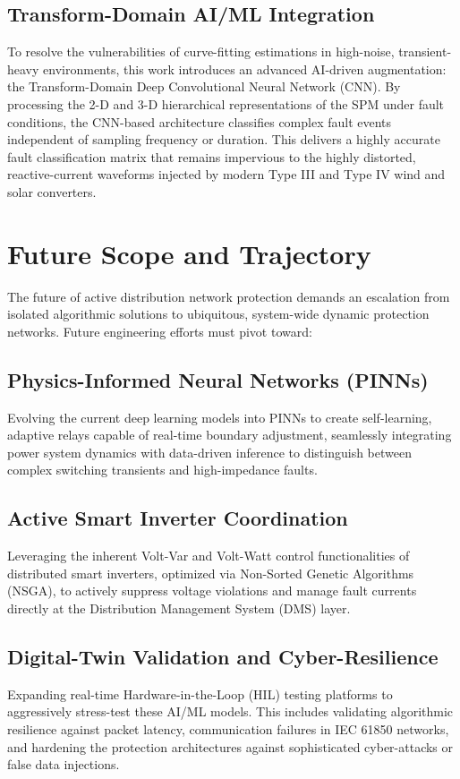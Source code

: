 \subsection{Transform-Domain AI/ML Integration}
To resolve the vulnerabilities of curve-fitting estimations in high-noise, transient-heavy environments, this work introduces an advanced AI-driven augmentation: the Transform-Domain Deep Convolutional Neural Network (CNN). By processing the 2-D and 3-D hierarchical representations of the SPM under fault conditions, the CNN-based architecture classifies complex fault events independent of sampling frequency or duration. This delivers a highly accurate fault classification matrix that remains impervious to the highly distorted, reactive-current waveforms injected by modern Type III and Type IV wind and solar converters.
\section{Future Scope and Trajectory}
The future of active distribution network protection demands an escalation from isolated algorithmic solutions to ubiquitous, system-wide dynamic protection networks. Future engineering efforts must pivot toward:
\subsection{Physics-Informed Neural Networks (PINNs)}
Evolving the current deep learning models into PINNs to create self-learning, adaptive relays capable of real-time boundary adjustment, seamlessly integrating power system dynamics with data-driven inference to distinguish between complex switching transients and high-impedance faults.
\subsection{Active Smart Inverter Coordination}
Leveraging the inherent Volt-Var and Volt-Watt control functionalities of distributed smart inverters, optimized via Non-Sorted Genetic Algorithms (NSGA), to actively suppress voltage violations and manage fault currents directly at the Distribution Management System (DMS) layer.
\subsection{Digital-Twin Validation and Cyber-Resilience}
Expanding real-time Hardware-in-the-Loop (HIL) testing platforms to aggressively stress-test these AI/ML models. This includes validating algorithmic resilience against packet latency, communication failures in IEC 61850 networks, and hardening the protection architectures against sophisticated cyber-attacks or false data injections.